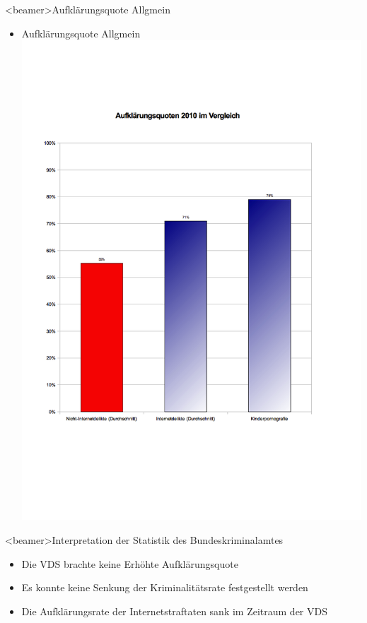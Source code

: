               \begin{frame}<beamer>{Aufklärungsquote Allgmein}
\begin{itemize}
        \item Aufklärungsquote Allgmein
        \includegraphics[height=1.25\textheight]{sections/img/aufklaerung.png}
    \end{itemize}
    \end{frame}
              \begin{frame}<beamer>{Interpretation der Statistik des Bundeskriminalamtes}
\begin{itemize}
        \item Die VDS brachte keine Erhöhte Aufklärungsquote
        \item Es konnte keine Senkung der Kriminalitätsrate festgestellt werden
        \item Die Aufklärungsrate der Internetstraftaten sank im Zeitraum der VDS
    \end{itemize}
    \end{frame}



